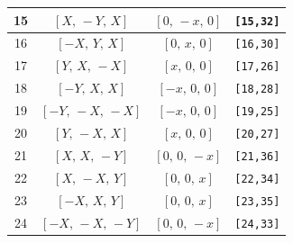 \documentclass[fleqn,8pt]{jsarticle}
\begin{document}
\begin{longtable}{cccc}
15 & $\left[ X,\, - Y,\, X \right]$ & $\left[ 0,\, - x,\, 0 \right]$ & {\tt [15,32]} \\ \hline
16 & $\left[ - X,\, Y,\, X \right]$ & $\left[ 0,\, x,\, 0 \right]$ & {\tt [16,30]} \\ \hline
17 & $\left[ Y,\, X,\, - X \right]$ & $\left[ x,\, 0,\, 0 \right]$ & {\tt [17,26]} \\ \hline
18 & $\left[ - Y,\, X,\, X \right]$ & $\left[ - x,\, 0,\, 0 \right]$ & {\tt [18,28]} \\ \hline
19 & $\left[ - Y,\, - X,\, - X \right]$ & $\left[ - x,\, 0,\, 0 \right]$ & {\tt [19,25]} \\ \hline
20 & $\left[ Y,\, - X,\, X \right]$ & $\left[ x,\, 0,\, 0 \right]$ & {\tt [20,27]} \\ \hline
21 & $\left[ X,\, X,\, - Y \right]$ & $\left[ 0,\, 0,\, - x \right]$ & {\tt [21,36]} \\ \hline
22 & $\left[ X,\, - X,\, Y \right]$ & $\left[ 0,\, 0,\, x \right]$ & {\tt [22,34]} \\ \hline
23 & $\left[ - X,\, X,\, Y \right]$ & $\left[ 0,\, 0,\, x \right]$ & {\tt [23,35]} \\ \hline
24 & $\left[ - X,\, - X,\, - Y \right]$ & $\left[ 0,\, 0,\, - x \right]$ & {\tt [24,33]} \\
\end{longtable}
\renewcommand{\arraystretch}{1.2}
\end{document}
